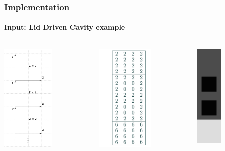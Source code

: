 \documentclass{beamer}
\begin{document}
\begin{frame}
\frametitle{Implementation}
\framesubtitle{Input: Lid Driven Cavity example}
\begin{columns}
\begin{column}{0.33\textwidth}
\begin{center}
\includegraphics[height=5.2cm]{coord.jpg}
\end{center}
\end{column}
\begin{column}{0.33\textwidth}
\begin{center}
\includegraphics[height=5.2cm]{cavity.png}
\end{center}
\end{column}
\begin{column}{0.33\textwidth}
\begin{center}
\includegraphics[height=5cm]{cavity20202.jpg}
\end{center}
\end{column}
\end{columns}
\end{frame}
\end{document}
